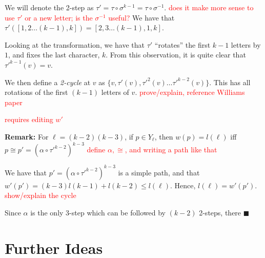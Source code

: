 \documentclass{article}
\theoremstyle{definition}
\newcommand{\edit}[1]{\textcolor{red}{#1}}
\newcommand{\rough}[1]{}%
\begin{document}
{We will denote the 2-step as $\tau' = \tau \circ \sigma^{k-1} = \tau \circ \sigma^{-1}$.\edit{ does it make more sense to use $\tau'$ or a new letter; is the $\sigma^{-1}$ useful?} We have that $\tau'([1,2\dots (k-1),k]) = [2,3\dots (k-1),1,k]$.

\vspace{1.75em}

Looking at the transformation, we have that $\tau'$ ``rotates'' the first $k-1$ letters by $1$, and fixes the last character, $k$. From this observation, it is quite clear that $\tau'^{k-1}(v) = v$. 

We then define a \textit{2-cycle} at $v$ as $\{v, \tau'(v), \tau'^2(v) \dots \tau'^{k-2}(v)\}$. This has all rotations of the first $(k-1)$ letters of $v$.\edit{ prove/explain, reference Williams paper}

\rough{$l(k-2) = k-3, l_2(k-2) = k-2, l(k-1) = k-1$}\edit{ requires editing $w'$}


\rough{LEMMA SETUP}\textbf{Remark:} For $\ell = (k-2)(k-3)$, if $p \in Y_{\ell}$, then $w(p) = l(\ell)$ iff $p \cong p' = (\alpha \circ \tau'^{k-2})^{k-3}$\edit{ define $\alpha, \cong$, and writing a path like that}

\vspace{1.75em}

We have that $p' = (\alpha \circ \tau'^{k-2})^{k-3}$ is a simple path, and that $w'(p') = (k-3)l(k-1)+l(k-2) \leq l(\ell)$. Hence, $l(\ell) = w'(p')$.\edit{ show/explain the cycle}

\vspace{1.75em}

\rough{SHOW $p \ncong p' \in Y_\ell, w(p') > p$}

Since $\alpha$ is the only 3-step which can be followed by $(k-2)$ 2-steps, there
$\blacksquare$




\section{Further Ideas}

}
\end{document}
